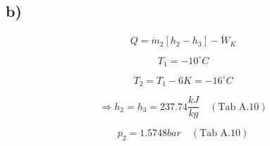 

\subsection*{b)}

\[
Q = \dot{m}_2 \left[ h_2 - h_3 \right] - \dot{W}_K
\]

\[
T_1 = -10^\circ C
\]

\[
T_2 = T_1 - 6K = -16^\circ C
\]

\[
\Rightarrow h_2 = h_3 = 237.74 \frac{kJ}{kg} \quad (\text{Tab A.10})
\]

\[
p_2 = 1.5748 bar \quad (\text{Tab A.10})
\]